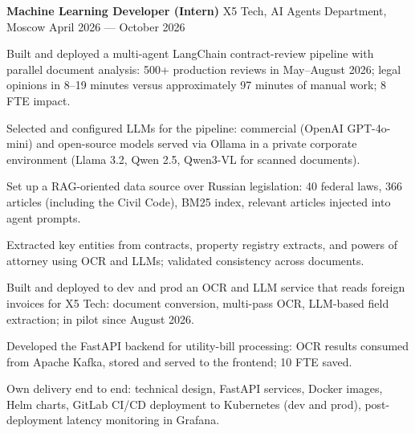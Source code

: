 \documentclass[10pt,a4paper]{article}
\newcommand{\cventry}[3]{%
  \textbf{#1} \textbar{} #3 \textbar{} #2\par\vspace{1pt}}
\begin{document}
\cventry{Machine Learning Developer (Intern)}{April 2026 --- October 2026}{X5 Tech, AI Agents Department, Moscow}
\begin{cvitems}
    \item Built and deployed a multi-agent LangChain contract-review pipeline with parallel document analysis: 500+ production reviews in May--August 2026; legal opinions in 8--19 minutes versus approximately 97 minutes of manual work; 8 FTE impact.
    \item Selected and configured LLMs for the pipeline: commercial (OpenAI GPT-4o-mini) and open-source models served via Ollama in a private corporate environment (Llama 3.2, Qwen 2.5, Qwen3-VL for scanned documents).
    \item Set up a RAG-oriented data source over Russian legislation: 40 federal laws, 366 articles (including the Civil Code), BM25 index, relevant articles injected into agent prompts.
    \item Extracted key entities from contracts, property registry extracts, and powers of attorney using OCR and LLMs; validated consistency across documents.
    \item Built and deployed to dev and prod an OCR and LLM service that reads foreign invoices for X5 Tech: document conversion, multi-pass OCR, LLM-based field extraction; in pilot since August 2026.
    \item Developed the FastAPI backend for utility-bill processing: OCR results consumed from Apache Kafka, stored and served to the frontend; 10 FTE saved.
    \item Own delivery end to end: technical design, FastAPI services, Docker images, Helm charts, GitLab CI/CD deployment to Kubernetes (dev and prod), post-deployment latency monitoring in Grafana.
\end{cvitems}
\end{document}
